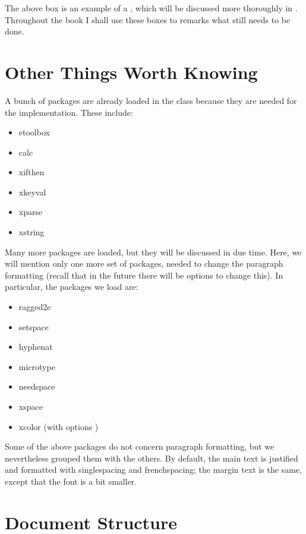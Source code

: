 The above box is an example of a , which will be 
discussed more thoroughly in . Throughout the book I 
shall use these boxes to remarks what still needs to be done.

\section{Other Things Worth Knowing}

A bunch of packages are already loaded in the class because they are 
needed for the implementation. These include:

\begin{itemize}
	\item etoolbox
	\item calc
	\item xifthen
	\item xkeyval
	\item xparse
	\item xstring
\end{itemize}

Many more packages are loaded, but they will be discussed in due time. 
Here, we will mention only one more set of packages, needed to change 
the paragraph formatting (recall that in the future there will be 
options to change this). In particular, the packages we load are:

\begin{itemize}
	\item ragged2e
	\item setspace
	\item hyphenat
	\item microtype
	\item needspace
	\item xspace
	\item xcolor (with options )
\end{itemize}

Some of the above packages do not concern paragraph formatting, but we 
nevertheless grouped them with the others. By default, the main text is 
justified and formatted with singlespacing and frenchspacing; the margin 
text is the same, except that the font is a bit smaller.

\section{Document Structure}

